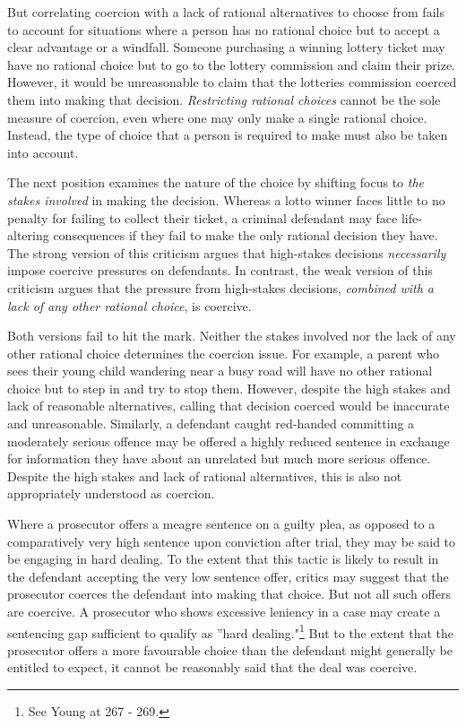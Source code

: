 But correlating coercion with a lack of rational alternatives to choose from fails to account for situations where a person has no rational choice but to accept a clear advantage or a windfall. Someone purchasing a winning lottery ticket may have no rational choice but to go to the lottery commission and claim their prize. However, it would be unreasonable to claim that the lotteries commission coerced them into making that decision. \textit{Restricting rational choices} cannot be the sole measure of coercion, even where one may only make a single rational choice. Instead, the type of choice that a person is required to make must also be taken into account.

The next position examines the nature of the choice by shifting focus to \textit{the stakes involved} in making the decision. Whereas a lotto winner faces little to no penalty for failing to collect their ticket, a criminal defendant may face life-altering consequences if they fail to make the only rational decision they have. The strong version of this criticism argues that high-stakes decisions \textit{necessarily} impose coercive pressures on defendants. In contrast, the weak version of this criticism argues that the pressure from high-stakes decisions, \textit{combined with a lack of any other rational choice}, is coercive. 

Both versions fail to hit the mark. Neither the stakes involved nor the lack of any other rational choice determines the coercion issue. For example, a parent who sees their young child wandering near a busy road will have no other rational choice but to step in and try to stop them. However, despite the high stakes and lack of reasonable alternatives, calling that decision coerced would be inaccurate and unreasonable. Similarly, a defendant caught red-handed committing a moderately serious offence may be offered a highly reduced sentence in exchange for information they have about an unrelated but much more serious offence. Despite the high stakes and lack of rational alternatives, this is also not appropriately understood as coercion.

Where a prosecutor offers a meagre sentence on a guilty plea, as opposed to a comparatively very high sentence upon conviction after trial, they may be said to be engaging in hard dealing. To the extent that this tactic is likely to result in the defendant accepting the very low sentence offer, critics may suggest that the prosecutor coerces the defendant into making that choice. But not all such offers are coercive. A prosecutor who shows excessive leniency in a case may create a sentencing gap sufficient to qualify as ''hard dealing."\footnote{See Young at 267 - 269.} But to the extent that the prosecutor offers a more favourable choice than the defendant might generally be entitled to expect, it cannot be reasonably said that the deal was coercive.

